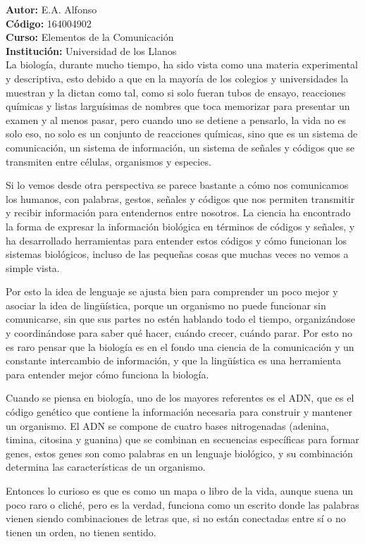\documentclass[12pt]{article}
\begin{document}
\textbf{Autor:} E.A. Alfonso \\
\textbf{Código:} 164004902 \\
\textbf{Curso:} Elementos de la Comunicación \\
\textbf{Institución:} Universidad de los Llanos \\

La biología, durante mucho tiempo, ha sido vista como una materia experimental y descriptiva, esto debido a que en la mayoría de los colegios y universidades la muestran y la dictan como tal, como si solo fueran tubos de ensayo, reacciones químicas y listas larguísimas de nombres que toca memorizar para presentar un examen y al menos pasar, pero cuando uno se detiene a pensarlo, la vida no es solo eso, no solo es un conjunto de reacciones químicas, sino que es un sistema de comunicación, un sistema de información, un sistema de señales y códigos que se transmiten entre células, organismos y especies.

Si lo vemos desde otra perspectiva se parece bastante a cómo nos comunicamos los humanos, con palabras, gestos, señales y códigos que nos permiten transmitir y recibir información para entendernos entre nosotros. La ciencia ha encontrado la forma de expresar la información biológica en términos de códigos y señales, y ha desarrollado herramientas para entender estos códigos y cómo funcionan los sistemas biológicos, incluso de las pequeñas cosas que muchas veces no vemos a simple vista.

Por esto la idea de lenguaje se ajusta bien para comprender un poco mejor y asociar la idea de lingüística, porque un organismo no puede funcionar sin comunicarse, sin que sus partes no estén hablando todo el tiempo, organizándose y coordinándose para saber qué hacer, cuándo crecer, cuándo parar. Por esto no es raro pensar que la biología es en el fondo una ciencia de la comunicación y un constante intercambio de información, y que la lingüística es una herramienta para entender mejor cómo funciona la biología.

Cuando se piensa en biología, uno de los mayores referentes es el ADN, que es el código genético que contiene la información necesaria para construir y mantener un organismo. El ADN se compone de cuatro bases nitrogenadas (adenina, timina, citosina y guanina) que se combinan en secuencias específicas para formar genes, estos genes son como palabras en un lenguaje biológico, y su combinación determina las características de un organismo.

Entonces lo curioso es que es como un mapa o libro de la vida, aunque suena un poco raro o cliché, pero es la verdad, funciona como un escrito donde las palabras vienen siendo combinaciones de letras que, si no están conectadas entre sí o no tienen un orden, no tienen sentido.
\end{document}
